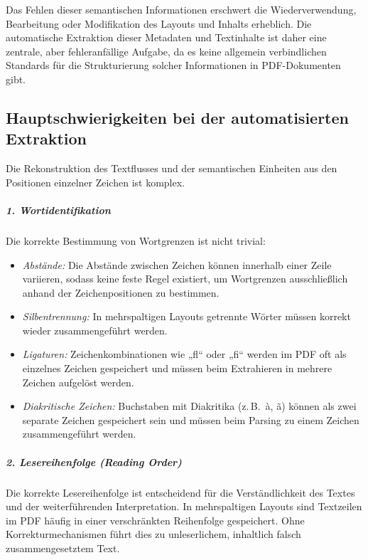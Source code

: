 Das Fehlen dieser semantischen Informationen erschwert die Wiederverwendung, Bearbeitung oder Modifikation des Layouts und Inhalts erheblich. \cite{Corrêa2017}
Die automatische Extraktion dieser Metadaten und Textinhalte ist daher eine zentrale, aber fehleranfällige Aufgabe, da es keine 
allgemein verbindlichen Standards für die Strukturierung solcher Informationen in PDF-Dokumenten gibt. \cite{Lipinski2013}





\subsection{Hauptschwierigkeiten bei der automatisierten Extraktion}

Die Rekonstruktion des Textflusses und der semantischen Einheiten aus den Positionen einzelner Zeichen ist komplex.

\subparagraph{1. Wortidentifikation}
Die korrekte Bestimmung von Wortgrenzen ist nicht trivial:
\begin{itemize}
    \item \emph{Abstände:} Die Abstände zwischen Zeichen können innerhalb einer Zeile variieren, sodass keine feste Regel existiert, 
    um Wortgrenzen ausschließlich anhand der Zeichenpositionen zu bestimmen. \cite{Bast2017}
    \item \emph{Silbentrennung:} In mehrspaltigen Layouts getrennte Wörter müssen korrekt wieder zusammengeführt werden. \cite{Bast2017}
    \item \emph{Ligaturen:} Zeichenkombinationen wie „fl“ oder „fi“ werden im PDF oft als einzelnes Zeichen gespeichert und 
    müssen beim Extrahieren in mehrere Zeichen aufgelöst werden. \cite{Lipinski2013}
    \item \emph{Diakritische Zeichen:} Buchstaben mit Diakritika (z.\,B.\ à, ã) können als zwei separate Zeichen gespeichert sein
    und müssen beim Parsing zu einem Zeichen zusammengeführt werden. \cite{Bast2017}
\end{itemize}

\subparagraph{2. Lesereihenfolge (Reading Order)}
Die korrekte Lesereihenfolge ist entscheidend für die Verständlichkeit des Textes und der weiterführenden Interpretation.  \cite{Bast2017}
In mehrspaltigen Layouts sind Textzeilen im PDF häufig in einer verschränkten Reihenfolge gespeichert. 
Ohne Korrekturmechanismen führt dies zu unleserlichem, inhaltlich falsch zusammengesetztem Text.\cite{Lovegrove1995}

